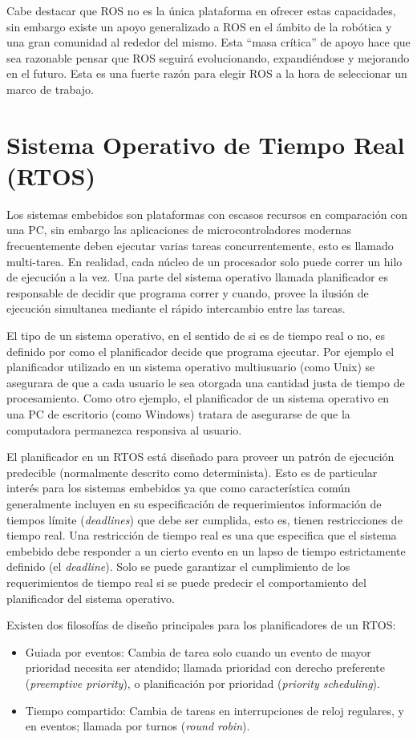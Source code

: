 \documentclass[withindex,glossary]{cam-thesis}
\begin{document}
Cabe destacar que ROS no es la única plataforma en ofrecer estas capacidades, sin embargo existe un apoyo generalizado a ROS en el ámbito de la robótica y una gran comunidad al rededor del mismo. Esta ``masa crítica'' de apoyo hace que sea razonable pensar que ROS seguirá evolucionando, expandiéndose y mejorando en el futuro. Esta es una fuerte razón para elegir ROS a la hora de seleccionar un marco de trabajo.

\section{Sistema Operativo de Tiempo Real (RTOS)}\label{sec: Marco Teórico - RTOS }
Los sistemas embebidos son plataformas con escasos recursos en comparación con una PC, sin embargo las aplicaciones de microcontroladores modernas frecuentemente deben ejecutar varias tareas concurrentemente, esto es llamado multi-tarea. En realidad, cada núcleo de un procesador solo puede correr un hilo de ejecución a la vez. Una parte del sistema operativo llamada planificador es responsable de decidir que programa correr y cuando, provee la ilusión de ejecución simultanea mediante el rápido intercambio entre las tareas.

El tipo de un sistema operativo, en el sentido de si es de tiempo real o no, es definido por como el planificador decide que programa ejecutar. Por ejemplo el planificador utilizado en un sistema operativo multiusuario (como Unix) se asegurara de que a cada usuario le sea otorgada una cantidad justa de tiempo de procesamiento. Como otro ejemplo, el planificador de un sistema operativo en una PC de escritorio (como Windows) tratara de asegurarse de que la computadora permanezca responsiva al usuario. 

El planificador en un RTOS está diseñado para proveer un patrón de ejecución predecible (normalmente descrito como determinista). Esto es de particular interés para los sistemas embebidos ya que como característica común generalmente incluyen en su especificación de requerimientos información de tiempos límite (\textit{deadlines}) que debe ser cumplida, esto es, tienen restricciones de tiempo real. Una restricción de tiempo real es una que especifica que el sistema embebido debe responder a un cierto evento en un lapso de tiempo estrictamente definido (el \textit{deadline}). Solo se puede garantizar el cumplimiento de los requerimientos de tiempo real si se puede predecir el comportamiento del planificador del sistema operativo.

Existen dos filosofías de diseño principales para los planificadores de un RTOS:	
\begin{itemize}[topsep=-11pt]
  \item Guiada por eventos: Cambia de tarea solo cuando un evento de mayor prioridad necesita ser atendido; llamada prioridad con derecho preferente (\textit{preemptive priority}), o planificación por prioridad (\textit{priority scheduling}).
  \item Tiempo compartido: Cambia de tareas en interrupciones de reloj regulares, y en eventos; llamada por turnos (\textit{round robin}). \\[-7pt]
\end{itemize}
\end{document}

